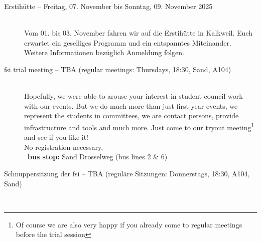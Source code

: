 \begin{description}

\ifml
\else
   \item[Erstihütte -- Freitag, 07. November bis Sonntag, 09. November 2025]~\\
   Vom 01. bis 03. November fahren wir auf die Erstihütte in Kalkweil.
   Euch erwartet ein geselliges Programm und ein entspanntes Miteinander.
   Weitere Informationen bezüglich Anmeldung folgen.
\fi

\ifkogwiss
\else
    \ifml
        \item[fsi trial meeting -- TBA (regular meetings: Thursdays, 18:30, Sand, A104)]~\\%
        Hopefully, we were able to arouse your interest in student council work with our events.
        But we do much more than just first-year events, we represent the students in committees,
        we are contact persons, provide infrastructure and tools and much more.
        Just come to our tryout meeting\footnote{Of course we are also very happy if you already come to regular meetings before the trial session}
        and see if you like it!\\
        No registration necessary.\\
        ~\textbf{bus stop:} Sand Drosselweg (bus lines 2 \& 6)
    \else
        \item[Schnuppersitzung der fsi -- TBA (reguläre Sitzungen: Donnerstags, 18:30, A104, Sand)]~\\%

\end{description}
